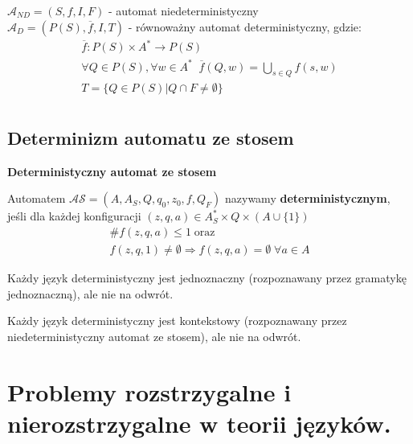 \documentclass[main.tex]{subfiles}
\begin{document}
    $\mathcal{A}_{ND} = (S, f, I, F)$ - automat niedeterministyczny\\
    \indent$\mathcal{A}_D = (P(S), \overline{f}, I, T)$ - równoważny automat deterministyczny, gdzie:
    \begin{gather*}
        \overline{f} : P(S) \times A^* \rightarrow P(S)\\
        \forall Q \in P(S), \forall w \in A^* \; \; \overline{f}(Q, w) = \bigcup\limits_{s \in Q} f(s, w)\\
        T = \{Q \in P(S) | Q \cap F \neq \emptyset\}\\
    \end{gather*}

    \subsection{Determinizm automatu ze stosem}

    \begin{definition}
        \textbf{Deterministyczny automat ze stosem}

        Automatem $\mathcal{AS} = (A, A_S, Q, q_0, z_0, f, Q_F)$ nazywamy
        \textbf{deterministycznym}, jeśli dla każdej konfiguracji
        $(z, q, a) \in A_S^* \times Q \times (A \cup \{1\})$
        \begin{gather*}
            \# f(z, q, a) \leq 1 \; \mathrm{oraz}\\
            f(z, q, 1) \neq \emptyset \Rightarrow f(z, q, a) = \emptyset \; \forall a \in A
        \end{gather*}
    \end{definition}

    \begin{theorem}
        Każdy język deterministyczny jest jednoznaczny (rozpoznawany przez gramatykę jednoznaczną), ale nie na odwrót.
    \end{theorem}

    \begin{theorem}
        Każdy język deterministyczny jest kontekstowy (rozpoznawany przez niedeterministyczny automat ze stosem), ale nie na odwrót.
    \end{theorem}


    \section{Problemy rozstrzygalne i nierozstrzygalne w teorii języków.}
\end{document}
